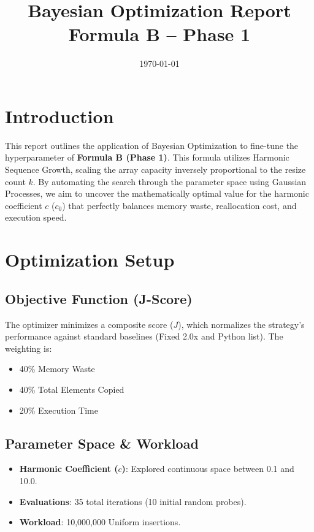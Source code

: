 \documentclass[11pt, a4paper]{article}
\title{Bayesian Optimization Report \\ \Large Formula B -- Phase 1}
\author{}
\date{\today}
\begin{document}
\maketitle
\tableofcontents
\listoffigures
\listoftables
\newpage

\section{Introduction}
This report outlines the application of Bayesian Optimization to fine-tune the hyperparameter of \textbf{Formula B (Phase 1)}. This formula utilizes Harmonic Sequence Growth, scaling the array capacity inversely proportional to the resize count $k$. By automating the search through the parameter space using Gaussian Processes, we aim to uncover the mathematically optimal value for the harmonic coefficient $c$ ($c_0$) that perfectly balances memory waste, reallocation cost, and execution speed.

\section{Optimization Setup}

\subsection{Objective Function (J-Score)}
The optimizer minimizes a composite score ($J$), which normalizes the strategy's performance against standard baselines (Fixed 2.0x and Python list). The weighting is:
\begin{itemize}
    \item 40\% Memory Waste
    \item 40\% Total Elements Copied
    \item 20\% Execution Time
\end{itemize}

\subsection{Parameter Space \& Workload}
\begin{itemize}
    \item \textbf{Harmonic Coefficient ($c$)}: Explored continuous space between 0.1 and 10.0.
    \item \textbf{Evaluations}: 35 total iterations (10 initial random probes).
    \item \textbf{Workload}: 10,000,000 Uniform insertions.
\end{itemize}
\end{document}
